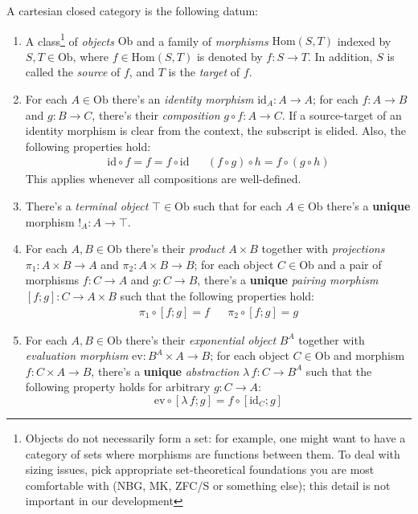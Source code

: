 \begin{definition}\label{ccc}
A cartesian closed category is the following datum:
\begin{enumerate}
\item A class\footnote{Objects do not necessarily form a
    set: for example, one might want to have a category
    of sets where morphisms are functions between them.
    To deal with sizing issues, pick appropriate
    set-theoretical foundations you are most comfortable
    with (NBG, MK, ZFC/S or something else); this detail
    is not important in our development} of
    \textit{objects} $\mathrm{Ob}$ and a family of
    \textit{morphisms} $\mathrm{Hom}(S, T)$ indexed by
    $S,T\in\mathrm{Ob}$, where $f\in\mathrm{Hom}(S,T)$
    is denoted by $f:S\to T$. In addition, $S$ is called
    the \textit{source} of $f$, and $T$ is the
    \textit{target} of $f$.
\item For each $A\in\mathrm{Ob}$ there's an
    \textit{identity morphism} $\mathrm{id}_A: A\to A$;
    for each $f:A\to B$ and $g:B\to C$, there's their
    \textit{composition} $g\circ f:A\to C$. If a
    source-target of an identity morphism is clear from
    the context, the subscript is elided. Also, the
    following properties hold:
    \begin{align*}
        \mathrm{id}\circ f = f = f\circ\mathrm{id} & &
        (f \circ g) \circ h = f \circ (g \circ h)
    \end{align*}
    This applies whenever all compositions are well-defined.
\item There's a \textit{terminal object}
    $\top\in\mathrm{Ob}$ such that for each
    $A\in\mathrm{Ob}$ there's a \textbf{unique} morphism
    $!_A:A\to\top$.
\item For each $A,B\in\mathrm{Ob}$ there's their
    \textit{product} $A\times B$ together with
    \textit{projections} $\pi_1:A\times B\to A$ and
    $\pi_2:A\times B\to B$; for each object
    $C\in\mathrm{Ob}$ and a pair of morphisms $f:C\to A$
    and $g:C\to B$, there's a \textbf{unique}
    \textit{pairing morphism} $[f;g]:C\to A\times B$
    such that the following properties hold:
    \begin{align*}
        \pi_1\circ[f;g]=f & & \pi_2\circ[f;g]=g
    \end{align*}
\item For each $A,B\in\mathrm{Ob}$ there's their
    \textit{exponential object} $B^A$ together with
    \textit{evaluation morphism}
    $\mathrm{ev}:B^A\times A\to B$; for each object
    $C\in\mathrm{Ob}$ and morphism $f:C\times A\to B$,
    there's a \textbf{unique} \textit{abstraction}
    $\lambda\,f:C\to B^A$ such that the following
    property holds for arbitrary $g:C\to A$:
    \[
        \mathrm{ev}\circ[\lambda\,f; g]
        = f\circ[\mathrm{id}_C; g]
    \]
\end{enumerate}
\end{definition}

